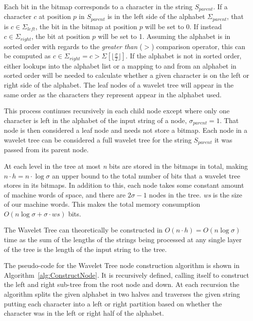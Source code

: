 Each bit in the bitmap corresponds to a character in the string $S_{\mathit{parent}}$.
If a character $c$ at position $p$ in $S_{\mathit{parent}}$ is in the left side of the alphabet $\Sigma_{\mathit{parent}}$, that is $c \in \Sigma_{\mathit{left}}$, the bit in the bitmap at position $p$ will be set to 0.
If instead $c \in \Sigma_{\mathit{right}}$, the bit at position $p$ will be set to 1.
Assuming the alphabet is in sorted order with regards to the \textit{greater than} ($>$) comparison operator, this can be computed as $c \in \Sigma_{\mathit{right}} = c > \Sigma[\lfloor\frac{\sigma}{2}\rfloor]$.
If the alphabet is not in sorted order, either lookups into the alphabet list or a mapping to and from an alphabet in sorted order will be needed to calculate whether a given character is on the left or right side of the alphabet.
The leaf nodes of a wavelet tree will appear in the same order as the characters they represent appear in the alphabet used.

This process continues recursively in each child node except where only one character is left in the alphabet of the input string of a node, $\sigma_{\mathit{parent}} = 1$.
That node is then considered a leaf node and needs not store a bitmap.
Each node in a wavelet tree can be considered a full wavelet tree for the string $S_{\mathit{parent}}$ it was passed from its parent node.

At each level in the tree at most \textit{n} bits are stored in the bitmaps in total, making $n \cdot h = n \cdot \log \sigma$ an upper bound to the total number of bits that a wavelet tree stores in its bitmaps.
In addition to this, each node takes some constant amount of machine words of space, and there are $2 \sigma -1$ nodes in the tree.
\textit{ws} is the size of our machine words.
This makes the total memory consumption $O(n \log \sigma + \sigma \cdot \mathit{ws})$ bits.

The Wavelet Tree can theoretically be constructed in $O(n \cdot h) = O(n \log \sigma)$ time as the sum of the lengths of the strings being processed at any single layer of the tree is the length of the input string to the tree.

The pseudo-code for the Wavelet Tree node construction algorithm is shown in Algorithm~\ref{alg:ConstructNode}. 
It is recursively defined, calling itself to construct the left and right sub-tree from the root node and down. At each recursion the algorithm splits the given alphabet in two halves and traverses the given string putting each character into a left or right partition based on whether the character was in the left or right half of the alphabet.

